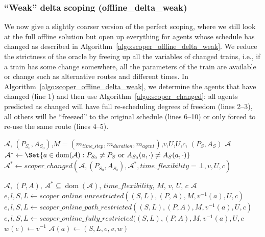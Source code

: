 \documentclass{article}
\DeclareMathOperator{\dom}{dom}
\begin{document}
\subsubsection{``Weak'' delta scoping (offline\_delta\_weak)}\label{subsubsec:offline_delta_weak}


We now give a slightly coarser version of the perfect scoping, where we still look at the full offline solution but open up everything for agents whose schedule has changed as described in Algorithm~\ref{algo:scoper_offline_delta_weak}. We reduce the strictness of the oracle by freeing up all the variables of changed trains, i.e., if a train has some change somewhere, all the parameters of the train are available or change such as alternative routes and different times. In Algorithm~\ref{algo:scoper_offline_delta_weak}, we determine the agents that have changed (line 1) and then use Algorithm~\ref{algo:scoper_changed}:
all agents predicted as changed will have full re-scheduling degrees of freedom (lines 2--3), all others will be ``freezed'' to the original schedule (lines 6--10) or only forced to re-use the same route (lines 4--5).

\begin{algorithm}
	\caption{$scoper\_offline\_delta\_weak$} \label{algo:scoper_offline_delta_weak}
	\begin{algorithmic}[1]
		\Require $\mathcal{A}$, $(P_{S_0},A_{S_0})$,$M=(m_{time\_step},m_{duration},m_{agent})$,$v$,$U$,$U$,$c$, $(P_S,A_S)$
	    \Ensure $\mathcal{A}$
	    \State $\mathcal{A}^* \leftarrow \Set{a\in \dom(\mathcal{A}):  P_{S_0} \not=P_{S} \textrm { or } A_{S_0}(a,\cdot) \not= A_{S}(a,\cdot)}$
	    \State $\mathcal{A}^* \leftarrow scoper\_changed(\mathcal{A},(P_{S_0},A_{S_0}),\mathcal{A}^*,time\_flexibility=\bot,v,U,c)$
	\end{algorithmic}
\end{algorithm}




\begin{algorithm}
	\caption{$scoper\_changed$} \label{algo:scoper_changed}
	\begin{algorithmic}[1]
		\Require $\mathcal{A}$, $(P,A)$, $\mathcal{A}^*\subseteq\dom(\mathcal{A})$, $time\_flexibility$, $M$, $v$, $U$, $c$
	    \Ensure $\mathcal{A}$
	    \For{$a \in \dom(\mathcal{A})$}
    	        \State $e,l,S,L \leftarrow scoper\_online\_unrestricted((S,L), (P,A), M, v^{-1}(a), U, c)$
    	        \State $e,l,S,L \leftarrow scoper\_online\_path\_restricted((S,L), (P,A), M, v^{-1}(a), U, c)$
    	    \Else
    	        \State $e,l,S,L \leftarrow scoper\_online\_fully\_restricted((S,L), (P,A), M, v^{-1}(a), U, c$
    	    \EndIf
    	        \State $w(e) \leftarrow v^{-1}$
    	    \EndFor
    	    \State $\mathcal{A}(a) \leftarrow (S,L,e,v,w)$
	    \EndFor
	\end{algorithmic}
\end{algorithm}
\end{document}
